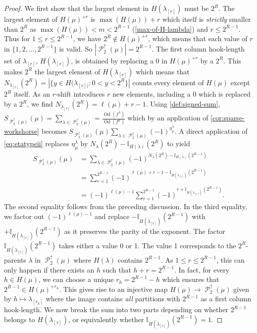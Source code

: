 \documentclass[12pt]{amsart}
\theoremstyle{definition}
\numberwithin{equation}{section}
\newcommand{\la}{\lambda}
\DeclareMathOperator{\p}{\mathcal{P}}
\DeclareMathOperator{\Od}{Od}
\begin{document}
\begin{proof}
We first show that the largest element in $H(\la_{[r]})$ must be $2^R$. The largest element of $H(\mu)^{+r}$ is $\max(H(\mu))+r$ which itself is \textit{strictly} smaller than $2^R$ as $\max(H(\mu))< m< 2^{R-1}$ (\cref{max-of-H-lambda}) and $r \leq 2^{R-1}$. Thus for $1\leq r \leq 2^{R-1}$, we have $2^R \not\in H(\mu)^{+r}$, which means that each value of $r$ in $\{1,2,\ldots, 2^{R-1}\}$ is valid. So $|\p_2^\uparrow(\mu)| = 2^{R-1}$.
The first column hook-length set of $\lambda_{[r]}$, $H(\la_{[r]})$, is obtained by replacing a 0 in $H(\mu)^{+r}$ by a $2^R$. This makes $2^R$ the largest element of $H(\lambda_{[r]})$ which means that
$N_{\lambda_{[r]}}(2^R) = |\{y\in H(\lambda_{[r])}: 0 <  y < 2^R\}|$ counts every element of $H(\mu)$ except $2^R$ itself. As an $r$-shift introduces $r$ new elements, including a 0 which is replaced by a $2^R$, we find $N_{\lambda_{[r]}}(2^R) = \ell(\mu) + r - 1$. Using \cref{def:signed-sum}, $S_{\p_2^\uparrow(\mu)}(\mu) = \sum_{\la\in \p_2^\uparrow(\mu)}= \frac{\Od(f^\la)}{\Od(f^\mu)}$ which by an application of \cref{cor:sparse-workshorse} becomes $S_{\p_2^\uparrow(\mu)}(\mu) \sum_{\la\in \p_2^\uparrow(\mu)} (-1)^{\eta^\la_\mu}$. A direct application of \cref{eq:etatypeii} replaces $\eta^\la_\mu$  by $N_\la(2^R) - \mathbb{I}_{H(\la)}(2^R)$ to yield
\begin{align*}
S_{\p_2^\uparrow(\mu)}(\mu) &= \sum_{\la\in \p_2^\uparrow(\mu)} (-1)^{N_\la(2^R) - \mathbb{I}_{H(\la)}(2^{R-1})}\\
&=  \sum\limits_{r=1}^{2^{R-1}} (-1)^{\ell(\mu) + r - 1 - \mathbb{I}_{H(\lambda_{[r]})}(2^{R-1})}\\ 
&=(-1)^{\ell(\mu) - 1}\sum\limits_{r=1}^{2^{R-1}} (-1)^{r +\mathbb{I}_{H(\lambda_{[r]})}(2^{R-1})}.
\end{align*}
The second equality follows from the preceding discussion. In the third equality, we factor out $(-1)^{\ell(\mu)-1}$ and replace $-\mathbb{I}_{H(\lambda_{[r]})}(2^{R-1})$ with $+\mathbb{I}_{H(\lambda_{[r]})}(2^{R-1})$ as it preserves the parity of the exponent.
The factor $\mathbb{I}_{H(\lambda_{[r]})}(2^{R-1})$ takes either a value 0 or 1. The value 1 corresponds to the $2^R$-parents $\la$ in $\p_2^\uparrow(\mu)$ where $H(\la)$ contains $2^{R-1}$. As $1\leq r\leq 2^{R-1}$, this can only happen if there exists an $h$ such that $h +r = 2^{R-1}$. In fact, for every $h\in H(\mu)$, we can choose a unique $r_h = 2^{R-1} - h$ which ensures that $2^{R-1} \in H(\mu)^{+r_h}$. This gives rise to an injective map $H(\mu)\rightarrow\p_2^{\uparrow}(\mu)$ given by $h\mapsto \lambda_{[r_h]}$ where the image contains \textit{all} partitions with $2^{R-1}$ as a first column hook-length.  We now break the sum into two parts depending on whether $2^{R-1}$ belongs to $H(\lambda_{[r]})$, or equivalently whether $\mathbb{I}_{H(\lambda_{[r]})}(2^{R-1}) = 1$. 

\end{proof}
\end{document}
